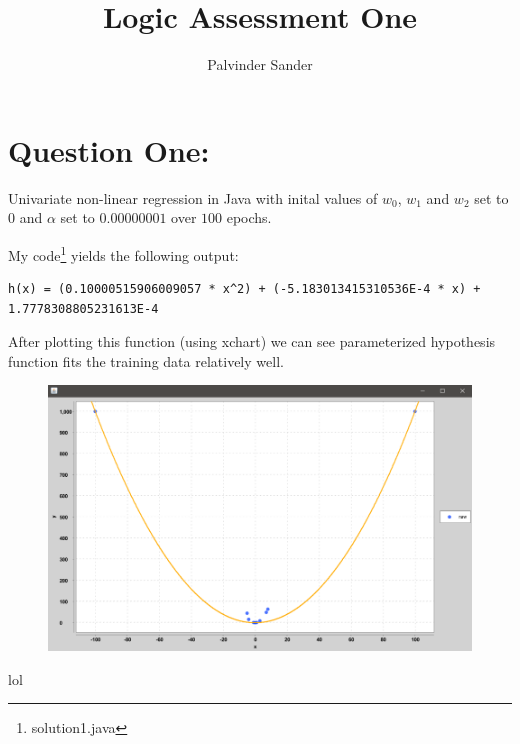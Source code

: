 \documentclass[a4paper]{article}
\title{Logic Assessment One}
\author{Palvinder Sander}
\date{}
\begin{document}
\section*{Question One:}

Univariate non-linear regression in Java with inital values of $w_{0}$, $w_{1}$ and $w_{2}$ set to $0$ and $\alpha$ set to $0.00000001$ over $100$ epochs.


\noindent My code\footnote{solution1.java} yields the following output:

\begin{verbatim}
h(x) = (0.10000515906009057 * x^2) + (-5.183013415310536E-4 * x) + 1.7778308805231613E-4
\end{verbatim}

\noindent After plotting this function (using xchart) we can see parameterized hypothesis function fits the training data relatively well.

\begin{figure}[h]
\includegraphics[scale=1]{q1.png}
\centering
\end{figure}
lol
\end{document}
